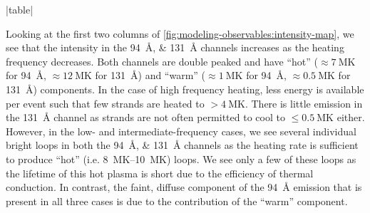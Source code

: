 |table|

Looking at the first two columns of \autoref{fig:modeling-observables:intensity-map}, we see that the intensity in the \SIlist{94;131}{\angstrom} channels increases as the heating frequency decreases. Both channels are double peaked and have ``hot'' ($\approx\SI{7}{\mega\kelvin}$ for \SI{94}{\angstrom}, $\approx\SI{12}{\mega\kelvin}$ for \SI{131}{\angstrom}) and ``warm'' ($\approx\SI{1}{\mega\kelvin}$ for \SI{94}{\angstrom}, $\approx\SI{0.5}{\mega\kelvin}$ for \SI{131}{\angstrom}) components. In the case of high frequency heating, less energy is available per event such that few strands are heated to $>\SI{4}{\mega\kelvin}$. There is little emission in the \SI{131}{\angstrom} channel as strands are not often permitted to cool to $\leq\SI{0.5}{\mega\kelvin}$ either. However, in the low- and intermediate-frequency cases, we see several individual bright loops in both the \SIlist{94;131}{\angstrom} channels as the heating rate is sufficient to produce ``hot'' (i.e. \SIrange{8}{10}{\mega\kelvin}) loops. We see only a few of these loops as the lifetime of this hot plasma is short due to the efficiency of thermal conduction. In contrast, the faint, diffuse component of the \SI{94}{\angstrom} emission that is present in all three cases is due to the contribution of the ``warm'' component. 

